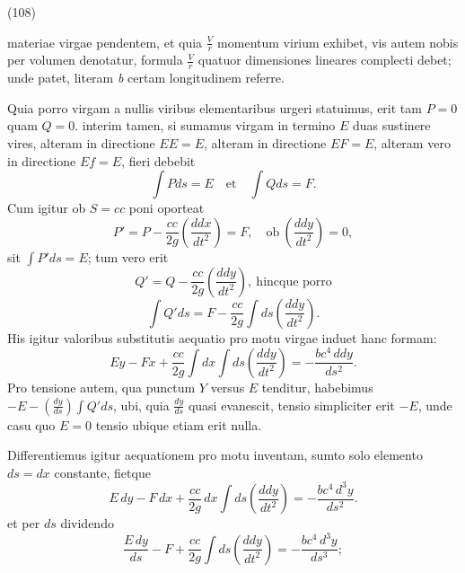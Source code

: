 \documentclass[11pt,a4paper]{article}
\begin{document}
(108)

materiae virgae pendentem, et quia $\frac{V}{r}$ momentum virium exhibet,
vis autem nobis per volumen denotatur, formula $\frac{V}{r}$ quatuor
dimensiones lineares complecti debet; unde patet, literam \emph{b} certam
longitudinem referre.

Quia porro virgam a nullis viribus elementaribus urgeri statuimus, erit tam
$P = 0$ quam $Q = 0$. interim tamen, si sumamus virgam in termino $E$ duas
sustinere vires, alteram in directione $EE = E$, alteram in directione
$EF = E$, alteram vero in directione $Ef = E$, fieri debebit
\[
\int Pds = E \quad\text{et}\quad \int Qds = F.
\]
Cum igitur ob $S = cc$ poni oporteat
\[
P' = P - \frac{cc}{2g}\left(\frac{ddx}{dt^2}\right) = F, \quad
\text{ob}\ \left(\frac{ddy}{dt^2}\right) = 0,
\]
sit $\int P'ds = E$; tum vero erit
\[
Q' = Q - \frac{cc}{2g}\left(\frac{ddy}{dt^2}\right), \ \text{hincque porro}
\]
\[
\int Q'ds = F - \frac{cc}{2g}\int ds \left(\frac{ddy}{dt^2}\right).
\]
His igitur valoribus substitutis aequatio pro motu virgae induet hanc
formam:
\[
Ey - Fx + \frac{cc}{2g}\int dx \int ds \left(\frac{ddy}{dt^2}\right)
= -\frac{bc^4\,ddy}{ds^2}.
\]
Pro tensione autem, qua punctum $Y$ versus $E$ tenditur, habebimus
$-E - \left(\frac{dy}{ds}\right)\int Q'ds$, ubi, quia $\frac{dy}{ds}$ quasi
evanescit, tensio simpliciter erit $-E$, unde casu quo $E = 0$ tensio ubique
etiam erit nulla.

Differentiemus igitur aequationem pro motu inventam, sumto solo elemento
$ds = dx$ constante, fietque
\[
E\,dy - F\,dx + \frac{cc}{2g}\,dx \int ds \left(\frac{ddy}{dt^2}\right)
= -\frac{bc^4\,d^3y}{ds^2}.
\]
et per $ds$ dividendo
\[
\frac{E\,dy}{ds} - F + \frac{cc}{2g}\int ds \left(\frac{ddy}{dt^2}\right)
= -\frac{bc^4\,d^3y}{ds^3};
\]
\end{document}
